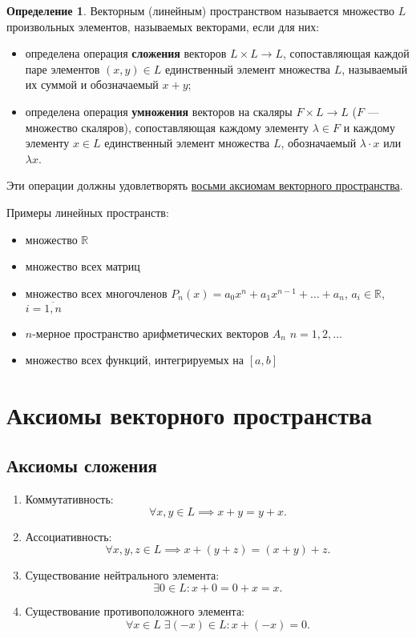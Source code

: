 \documentclass[a5paper, 11pt]{extbook}
\theoremstyle{definition}
\theoremstyle{definition}
\newtheorem{definition}{Определение}[chapter]
\begin{document}
\begin{definition}
    Векторным (линейным) пространством называется множество \(L\) произвольных элементов, называемых векторами, если для них:
    \begin{itemize}
        \item определена операция \textbf{сложения} векторов \(L \times L \to L\), сопоставляющая каждой паре элементов \((x, y) \in L\) единственный элемент множества \(L\), называемый их суммой и обозначаемый \(x + y\);
        \item определена операция \textbf{умножения} векторов на скаляры \(F \times L \to L\) (\(F\) — множество скаляров), сопоставляющая каждому элементу \(\lambda \in F\) и каждому элементу \(x \in L\) единственный элемент множества \(L\), обозначаемый \(\lambda \cdot x\) или \(\lambda x\).
    \end{itemize}

    Эти операции должны удовлетворять \hyperref[sec:vector-space-axiom]{восьми аксиомам векторного пространства}.
\end{definition}

\noindent Примеры линейных пространств:
\begin{itemize}
    \item множество \(\mathbb{R}\)
    \item множество всех матриц
    \item множество всех многочленов \(P_n (x) = a_0 x^n + a_1 x^{n - 1} + \ldots + a_n\), \(a_i \in \mathbb{R}\), \(i = \overline{1, n}\)
    \item \(n\)-мерное пространство арифметических векторов \(A_n\) \(n = 1, 2, \ldots\)
    \item множество всех функций, интегрируемых на \([a, b]\)
\end{itemize}

\section{Аксиомы векторного пространства}
\label{sec:vector-space-axiom}

\subsection{Аксиомы сложения}

\begin{enumerate}
    \item Коммутативность:
          \[
              \forall x, y \in L \implies x + y = y + x.
          \]
    \item Ассоциативность:
          \[
              \forall x, y, z \in L \implies x + (y + z) = (x + y) + z.
          \]
    \item Существование нейтрального элемента:
          \[
              \exists 0 \in L: x + 0 = 0 + x = x.
          \]
    \item Существование противоположного элемента:
          \[
              \forall x \in L \; \exists (-x) \in L: x + (-x) = 0.
          \]
\end{enumerate}
\end{document}
